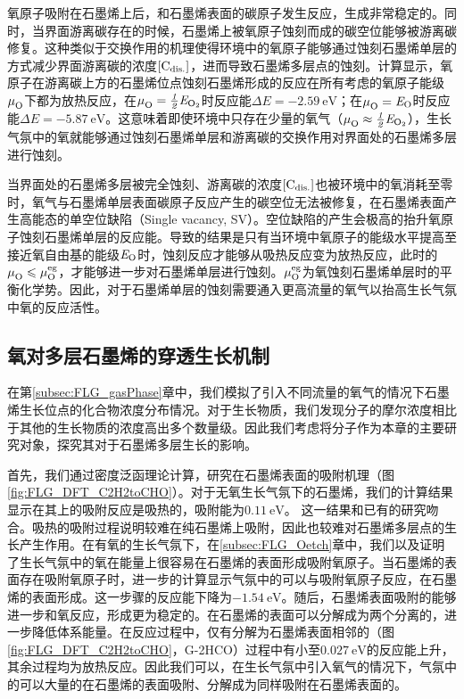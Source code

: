 氧原子吸附在石墨烯上后，和石墨烯表面的碳原子发生反应，生成非常稳定的。同时，当界面游离碳存在的时候，石墨烯上被氧原子蚀刻而成的碳空位能够被游离碳修复。这种类似于交换作用的机理使得环境中的氧原子能够通过蚀刻石墨烯单层的方式减少界面游离碳的浓度$\rm{\left[C_{dis.}\right]} \it$，进而导致石墨烯多层点的蚀刻。计算显示，氧原子在游离碳上方的石墨烯位点蚀刻石墨烯形成的反应在所有考虑的氧原子能级$\mu_{\rm O}^{\rm } \it$下都为放热反应，在$\muO{}=\halfEOm$时反应能$\Delta E=\SI{-2.59}{\electronvolt}$；在$\mu_{\rm O}^{\rm } \it=\it E_{\rm O} \it$时反应能$\Delta E=\SI{-5.87}{\electronvolt}$。这意味着即使环境中只存在少量的氧气（$\muO{} \approx \halfEOm$），生长气氛中的氧就能够通过蚀刻石墨烯单层和游离碳的交换作用对界面处的石墨烯多层进行蚀刻。

当界面处的石墨烯多层被完全蚀刻、游离碳的浓度$\rm{\left[C_{dis.}\right]} \it$也被环境中的氧消耗至零时，氧气与石墨烯单层表面碳原子反应产生的碳空位无法被修复，在石墨烯表面产生高能态的单空位缺陷（Single vacancy, SV）。空位缺陷的产生会极高的抬升氧原子蚀刻石墨烯单层的反应能。导致的结果是只有当环境中氧原子的能级水平提高至接近氧自由基的能级$\it E_{\rm O} \it$时，蚀刻反应才能够从吸热反应变为放热反应，此时的$\mu_{\rm O}^{\rm } \it \leqslant  \mu_{\rm O}^{\rm eg} \it  $，才能够进一步对石墨烯单层进行蚀刻。$\mu_{\rm O}^{\rm eg} \it$为氧蚀刻石墨烯单层时的平衡化学势。因此，对于石墨烯单层的蚀刻需要通入更高流量的氧气以抬高生长气氛中氧的反应活性。

\subsection{氧对多层石墨烯的穿透生长机制}
\label{subsec:Opene}
在第\ref{subsec:FLG_gasPhase}章中，我们模拟了引入不同流量的氧气的情况下石墨烯生长位点的化合物浓度分布情况。对于生长物质，我们发现分子的摩尔浓度相比于其他的生长物质的浓度高出多个数量级。因此我们考虑将分子作为本章的主要研究对象，探究其对于石墨烯多层生长的影响。

首先，我们通过密度泛函理论计算，研究在石墨烯表面的吸附机理（图\ref{fig:FLG_DFT_C2H2toCHO}）。对于无氧生长气氛下的石墨烯，我们的计算结果显示在其上的吸附反应是吸热的，吸附能为$\SI{0.11}{\electronvolt}$。
这一结果和已有的研究吻合。吸热的吸附过程说明较难在纯石墨烯上吸附，因此也较难对石墨烯多层点的生长产生作用。在有氧的生长气氛下，在\ref{subsec:FLG_Oetch}章中，我们以及证明了生长气氛中的氧在能量上很容易在石墨烯的表面形成吸附氧原子。当石墨烯的表面存在吸附氧原子时，进一步的计算显示气氛中的可以与吸附氧原子反应，在石墨烯的表面形成。这一步骤的反应能下降为$\SI{-1.54}{\electronvolt}$。随后，石墨烯表面吸附的能够进一步和氧反应，形成更为稳定的。在石墨烯的表面可以分解成为两个分离的，进一步降低体系能量。在反应过程中，仅有分解为石墨烯表面相邻的（图\ref{fig:FLG_DFT_C2H2toCHO}，G-2HCO）过程中有小至$\SI{0.027}{\electronvolt}$的反应能上升，其余过程均为放热反应。因此我们可以，在生长气氛中引入氧气的情况下，气氛中的可以大量的在石墨烯的表面吸附、分解成为同样吸附在石墨烯表面的。


